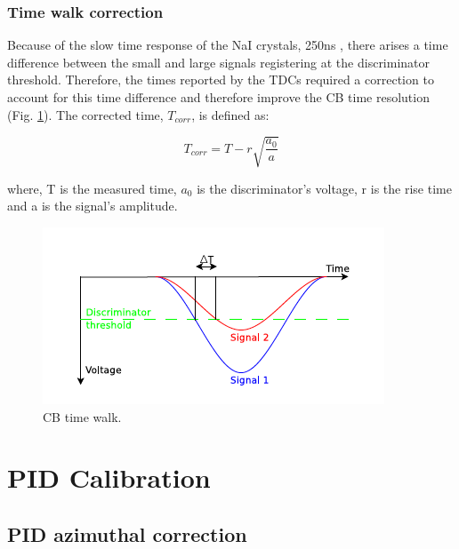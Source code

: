 \subsubsection{Time walk correction}

\indent Because of the slow time response of the NaI crystals, 250ns \cite{knoll}, there arises a time difference between the small and large signals registering at the discriminator threshold. Therefore, the times reported by the TDCs required a correction to account for this time difference and therefore improve the CB time resolution (Fig. \ref{cbtimewalk}). The corrected time, $T_{corr}$, is defined as:

\begin{equation}
T_{corr}=T - r\sqrt{\frac{a_{0}}{a}}
\end{equation}

where, T is the measured time, $a_{0}$ is the discriminator's voltage, r is the rise time and a is the signal's amplitude.

\begin{figure}[H]
\begin{center}
\includegraphics[scale=0.55]{cbtimewalk.png}
\caption{CB time walk.}
\label{cbtimewalk}
\end{center}
\end{figure}

\section{PID Calibration}

\subsection{PID azimuthal correction}

